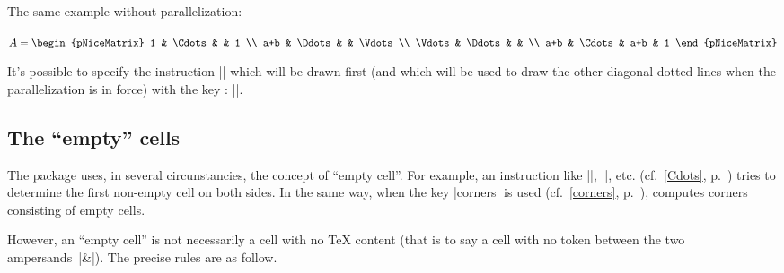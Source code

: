 \documentclass[dvipsnames]{article}
\begin{document}
\nobreak
\medskip
\begin{scope}
%
\begin{minipage}{9.5cm}
The same example without parallelization:
\end{minipage}
$A = \begin{pNiceMatrix}
1      & \Cdots  &     & 1      \\
a+b    & \Ddots  &     & \Vdots \\
\Vdots & \Ddots  &     &        \\
a+b    & \Cdots  & a+b & 1
\end{pNiceMatrix}$
\end{scope}

\medskip
It's possible to specify the instruction |\Ddots| which will be drawn first
(and which will be used to draw the other diagonal dotted lines when the
parallelization is in force) with the key :
||.



\subsection[The empty cells]{The ``empty'' cells}

\label{empty-cells}
The package  uses, in several circunstancies, the concept of
``empty cell''. For example, an instruction like |\Ldots|, |\Cdots|,
etc. (cf.~\ref{Cdots}, p.~\pageref{Cdots}) tries to determine the first non-empty
cell on both sides. In the same way, when the key |corners| is used
(cf.~\ref{corners}, p.~\pageref{corners}),  computes corners
consisting of empty cells. 

However, an ``empty cell'' is not necessarily a cell with no TeX
content (that is to say a cell with no token between the two ampersands~|&|).
The precise rules are as follow.
\end{document}
